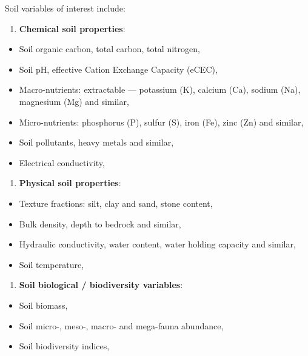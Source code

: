 \documentclass[
  graybox,natbib,nospthms]{svmono}
\providecommand{\tightlist}{%
  \setlength{\itemsep}{0pt}\setlength{\parskip}{0pt}}
\providecommand{\tightlist}{\setlength{\itemsep}{0pt}\setlength{\parskip}{0pt}}
\begin{document}
Soil variables of interest include:

\begin{enumerate}
\def\labelenumi{\arabic{enumi}.}
\tightlist
\item
  \textbf{Chemical soil properties}:
\end{enumerate}

\begin{itemize}
\tightlist
\item
  Soil organic carbon, total carbon, total nitrogen,
\item
  Soil pH, effective Cation Exchange Capacity (eCEC),
\item
  Macro-nutrients: extractable --- potassium (K), calcium (Ca), sodium
  (Na), magnesium (Mg) and similar,
\item
  Micro-nutrients: phosphorus (P), sulfur (S), iron (Fe), zinc (Zn)
  and similar,
\item
  Soil pollutants, heavy metals and similar,
\item
  Electrical conductivity,
\end{itemize}

\begin{enumerate}
\def\labelenumi{\arabic{enumi}.}
\setcounter{enumi}{1}
\tightlist
\item
  \textbf{Physical soil properties}:
\end{enumerate}

\begin{itemize}
\tightlist
\item
  Texture fractions: silt, clay and sand, stone content,
\item
  Bulk density, depth to bedrock and similar,
\item
  Hydraulic conductivity, water content, water holding capacity and
  similar,
\item
  Soil temperature,
\end{itemize}

\begin{enumerate}
\def\labelenumi{\arabic{enumi}.}
\setcounter{enumi}{2}
\tightlist
\item
  \textbf{Soil biological / biodiversity variables}:
\end{enumerate}

\begin{itemize}
\tightlist
\item
  Soil biomass,
\item
  Soil micro-, meso-, macro- and mega-fauna abundance,
\item
  Soil biodiversity indices,
\end{itemize}
\end{document}
